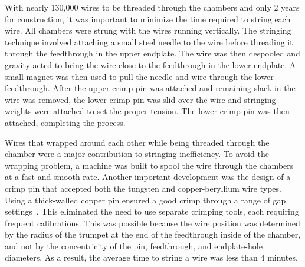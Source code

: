 With nearly 130,000 wires to be threaded through the chambers and only 2 years 
for construction, it was important to minimize the time required to string 
each wire.  All chambers were strung with 
the wires running vertically.  The stringing technique involved attaching a 
small steel needle to the wire before threading it through the feedthrough in 
the upper endplate.  The wire was then despooled and gravity acted to bring the 
wire close to the feedthrough in the lower endplate.  A small magnet was then 
used to pull the needle and wire through the lower feedthrough.  After the upper 
crimp pin was attached and remaining slack in the wire was removed, the lower 
crimp pin was slid over the wire and stringing weights were attached to set the 
proper tension.  The lower crimp pin was then attached, completing the process.
  
Wires that wrapped around each other while being threaded through the chamber 
were a major contribution to stringing inefficiency. To avoid the wrapping
problem, a machine was built to spool the wire through the chambers at a fast 
and smooth rate.  Another important development was the design of a crimp pin 
that accepted both the tungsten and copper-beryllium wire types.  Using a 
thick-walled 
copper pin ensured a good crimp through a range of gap settings~\cite{sbc}.  This 
eliminated the need to use separate crimping tools, each requiring frequent 
calibrations.  This was possible because the wire position was determined by the 
radius of the trumpet at the end of the feedthrough inside of the chamber, and 
not by the concentricity of the pin, feedthrough, and endplate-hole diameters. 
As a result, the average time to string a wire was less than 4 minutes.








